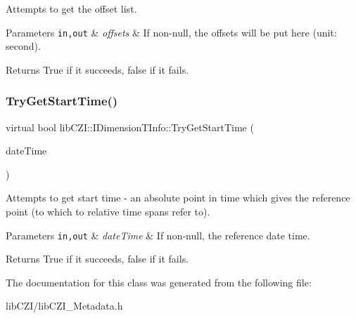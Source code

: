Attempts to get the offset list. 
\begin{DoxyParams}[1]{Parameters}
\mbox{\tt in,out}  & {\em offsets} & If non-\/null, the offsets will be put here (unit\+: second). \\
\hline
\end{DoxyParams}
\begin{DoxyReturn}{Returns}
True if it succeeds, false if it fails. 
\end{DoxyReturn}
\mbox{\label{classlib_c_z_i_1_1_i_dimension_t_info_ab815fa3e2df4f4d8a243a45e843f9a17}} 
\subsubsection{\texorpdfstring{Try\+Get\+Start\+Time()}{TryGetStartTime()}}
{\footnotesize\ttfamily virtual bool lib\+C\+Z\+I\+::\+I\+Dimension\+T\+Info\+::\+Try\+Get\+Start\+Time (\begin{DoxyParamCaption}\item[{\hyperlink{structlib_c_z_i_1_1_xml_date_time}{Xml\+Date\+Time} $\ast$}]{date\+Time }\end{DoxyParamCaption})\hspace{0.3cm}{\ttfamily [pure virtual]}}

Attempts to get start time -\/ an absolute point in time which gives the reference point (to which to relative time spans refer to). 
\begin{DoxyParams}[1]{Parameters}
\mbox{\tt in,out}  & {\em date\+Time} & If non-\/null, the reference date time. \\
\hline
\end{DoxyParams}
\begin{DoxyReturn}{Returns}
True if it succeeds, false if it fails. 
\end{DoxyReturn}


The documentation for this class was generated from the following file\+:\begin{DoxyCompactItemize}
\item 
lib\+C\+Z\+I/lib\+C\+Z\+I\+\_\+\+Metadata.\+h\end{DoxyCompactItemize}

